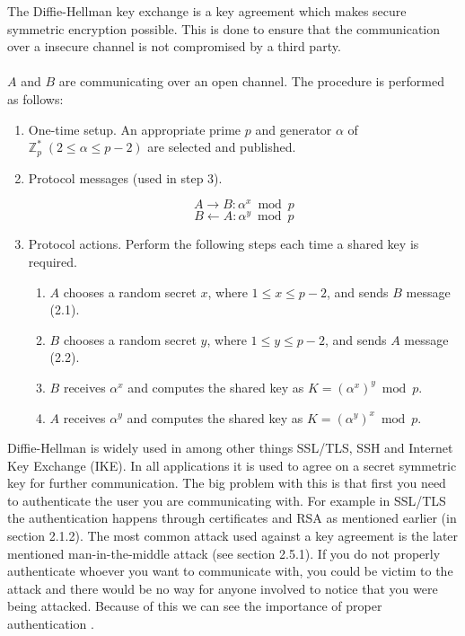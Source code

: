 \documentclass[frame, english]{idamasterthesis}
\begin{document}
\pagebreak
\noindent
The Diffie-Hellman key exchange is a key agreement which makes secure symmetric encryption possible. This is done to ensure that the communication over a insecure channel is not compromised by a third party. \\\\
$A$ and $B$ are communicating over an open channel.
The procedure is performed as follows: \cite{handcrypt}
\begin{enumerate}
    \item One-time setup. An appropriate prime $p$ and generator $\alpha$ of \\ $\mathbb{Z}^{*}_{p} \; (2 \leq \alpha \leq p - 2)$ are selected and published.
    \item Protocol messages (used in step 3).
    
    \begin{equation}    %
        A \rightarrow B : \alpha^x \bmod p 
    \end{equation}
    \begin{equation}    %
        B \leftarrow A : \alpha^y \bmod p
    \end{equation}
    
    \item Protocol actions. Perform the following steps each time a shared key is required. 
    \begin{enumerate}
        \item $A$ chooses a random secret $x$, where $1 \leq x \leq p - 2$, and sends $B$ message (2.1).
        \item $B$ chooses a random secret $y$, where $1 \leq y \leq p - 2$, and sends $A$ message (2.2).
        \item $B$ receives $\alpha^x$ and computes the shared key as $K = (\alpha^x)^y \bmod p$.
        \item $A$ receives $\alpha^y$ and computes the shared key as $K = (\alpha^y)^x \bmod p$. \\
    \end{enumerate}
\end{enumerate}

\noindent
Diffie-Hellman is widely used in among other things SSL/TLS, SSH and Internet Key Exchange (IKE). In all applications it is used to agree on a secret symmetric key for further communication. The big problem with this is that first you need to authenticate the user you are communicating with. For example in SSL/TLS the authentication happens through certificates and RSA as mentioned earlier (in section 2.1.2). The most common attack used against a key agreement is the later mentioned man-in-the-middle attack (see section 2.5.1). If you do not properly authenticate whoever you want to communicate with, you could be victim to the attack and there would be no way for anyone involved to notice that you were being attacked. Because of this we can see the importance of proper authentication \cite{ssl,ssh,ike-rfc,kerber-rfc}.
\end{document}
